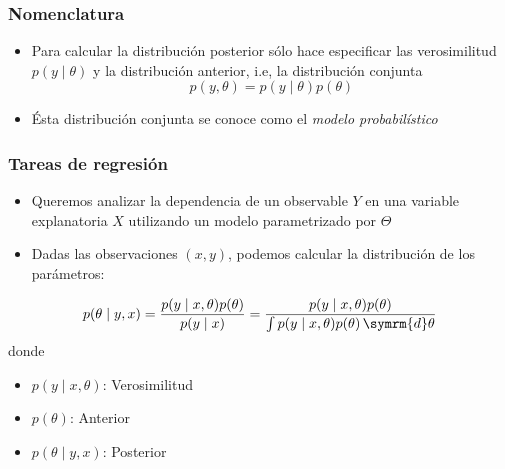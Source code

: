 \documentclass[xcolor=dvipsnames,10pt]{beamer}
\begin{document}
%
\begin{frame}
  \frametitle{Nomenclatura}
  \begin{itemize}
  \item Para calcular la distribución posterior sólo hace especificar las verosimilitud $p(y \mid \theta)$ y la distribución anterior, i.e, la distribución conjunta
    \begin{equation*}
      p(y, \theta) = p(y \mid \theta) p(\theta)
    \end{equation*}
  \item Ésta distribución conjunta se conoce como el \emph{modelo probabilístico}
  \end{itemize}
\end{frame}
%
\begin{frame}
  \frametitle{Tareas de regresión}
  \begin{itemize}
  \item Queremos analizar la dependencia de un observable $Y$ en una variable explanatoria $X$ utilizando un modelo parametrizado por $\Theta$
  \item Dadas las observaciones $(x, y)$, podemos calcular la distribución de los parámetros:
  \end{itemize}
  \begin{equation*}
    p(\theta \mid y, x) = \frac{p(y \mid x, \theta) p(\theta)}{p(y \mid x)} = \frac{p(y \mid x, \theta) p(\theta)}{\int p(y \mid x, \theta) p(\theta) \, \symrm{d} \theta}
  \end{equation*}
  donde
  \begin{itemize}
  \item $p(y \mid x, \theta)$: Verosimilitud
  \item $p(\theta)$: Anterior
  \item $p(\theta \mid y, x)$: Posterior
  \end{itemize}
\end{frame}
%
\begin{frame}
  \pythonframe
\end{frame}
\end{document}

